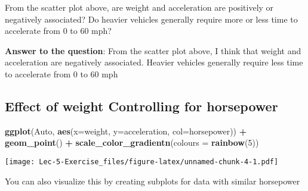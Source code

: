 \documentclass[
]{article}
\newenvironment{Shaded}{\begin{snugshade}}{\end{snugshade}}
\newcommand{\AttributeTok}[1]{\textcolor[rgb]{0.13,0.29,0.53}{#1}}
\newcommand{\DecValTok}[1]{\textcolor[rgb]{0.00,0.00,0.81}{#1}}
\newcommand{\FunctionTok}[1]{\textcolor[rgb]{0.13,0.29,0.53}{\textbf{#1}}}
\newcommand{\NormalTok}[1]{#1}
\newcommand{\SpecialCharTok}[1]{\textcolor[rgb]{0.81,0.36,0.00}{\textbf{#1}}}
\begin{document}
From the scatter plot above, are weight and acceleration are positively
or negatively associated? Do heavier vehicles generally require more or
less time to accelerate from 0 to 60 mph?

\textbf{Answer to the question}: From the scatter plot above, I think
that weight and acceleration are negatively associated. Heavier vehicles
generally require less time to accelerate from 0 to 60 mph

\hypertarget{effect-of-weight-controlling-for-horsepower}{%
\subsection{Effect of weight Controlling for
horsepower}\label{effect-of-weight-controlling-for-horsepower}}

\begin{Shaded}
\begin{Highlighting}[]
\FunctionTok{ggplot}\NormalTok{(Auto, }\FunctionTok{aes}\NormalTok{(}\AttributeTok{x=}\NormalTok{weight, }\AttributeTok{y=}\NormalTok{acceleration, }\AttributeTok{col=}\NormalTok{horsepower)) }\SpecialCharTok{+}
\FunctionTok{geom\_point}\NormalTok{() }\SpecialCharTok{+} \FunctionTok{scale\_color\_gradientn}\NormalTok{(}\AttributeTok{colours =} \FunctionTok{rainbow}\NormalTok{(}\DecValTok{5}\NormalTok{))}
\end{Highlighting}
\end{Shaded}

\texttt{[image: Lec-5-Exercise\_files/figure-latex/unnamed-chunk-4-1.pdf]}

You can also visualize this by creating subplots for data with similar
horsepower
\end{document}
